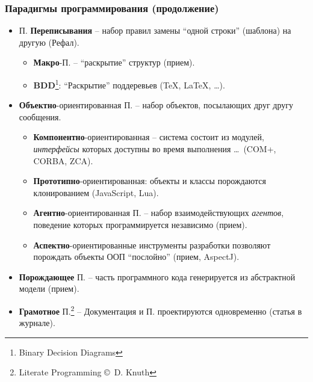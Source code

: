 \documentclass[10pt]{beamer}
\begin{document}
\begin{frame}
  \frametitle{Парадигмы программирования (продолжение)}
  \begin{itemize}
  \item П. \textbf{Переписывания} -- набор правил замены ``одной строки'' (шаблона) на другую (Рефал).
    \begin{itemize}
      \item \textbf{Макро}-П. -- ``раскрытие'' структур (прием).
      \item \textbf{BDD}\footnote{Binary Decision Diagrams}: ``Раскрытие'' поддеревьев (\TeX, \LaTeX, \ldots).
    \end{itemize}
  \item \textbf{Объектно}-ориентированная П. -- набор объектов, посылающих друг другу сообщения.
    \begin{itemize}
    \item \textbf{Компонентно}-ориентированная -- система состоит из модулей, \emph{интерфейсы} которых доступны во время выполнения \ldots\ (COM+, CORBA, ZCA).
    \item \textbf{Прототипно}-ориентированная: объекты и классы порождаются клонированием (JavaScript, Lua).
    \item \textbf{Агентно}-ориентированная П. -- набор взаимодействующих \emph{агентов}, поведение которых программируется независимо (прием).
    \item \textbf{ Аспектно}-ориентированные инструменты разработки позволяют порождать объекты ООП ``послойно'' (прием, AspectJ).
    \end{itemize}
    \item \textbf{Порождающее} П. -- часть программного кода генерируется из абстрактной модели (прием).
    \item \textbf{Грамотное} П.\footnote{Literate Programming \copyright\ D. Knuth} -- Документация и П. проектируются одновременно (статья в журнале).
  \end{itemize}
\end{frame}
\end{document}
